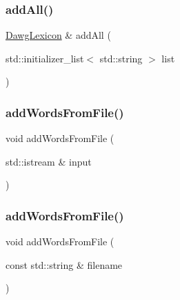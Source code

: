 \mbox{\label{classDawgLexicon_a3f7e696b6fee0d99db3f27619aa559b9}} 
\subsubsection{\texorpdfstring{add\+All()}{addAll()}\hspace{0.1cm}{\footnotesize\ttfamily [2/2]}}
{\footnotesize\ttfamily \mbox{\hyperlink{classDawgLexicon}{Dawg\+Lexicon}} \& add\+All (\begin{DoxyParamCaption}\item[{std\+::initializer\+\_\+list$<$ std\+::string $>$}]{list }\end{DoxyParamCaption})}

\mbox{\label{classDawgLexicon_a215fcead487aace2e89b04863e326ba6}} 
\subsubsection{\texorpdfstring{add\+Words\+From\+File()}{addWordsFromFile()}\hspace{0.1cm}{\footnotesize\ttfamily [1/2]}}
{\footnotesize\ttfamily void add\+Words\+From\+File (\begin{DoxyParamCaption}\item[{std\+::istream \&}]{input }\end{DoxyParamCaption})}

\mbox{\label{classDawgLexicon_a3891deaa85aee9a52b6ca258d1514716}} 
\subsubsection{\texorpdfstring{add\+Words\+From\+File()}{addWordsFromFile()}\hspace{0.1cm}{\footnotesize\ttfamily [2/2]}}
{\footnotesize\ttfamily void add\+Words\+From\+File (\begin{DoxyParamCaption}\item[{const std\+::string \&}]{filename }\end{DoxyParamCaption})}

